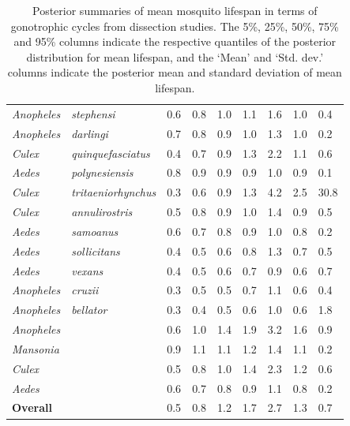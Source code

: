 \documentclass[12pt]{article}
\begin{document}
{\begin{table}[htbp]
\begin{tabular}{l|l|l|l|l|l|l|l|l}
		\textit{Anopheles} & \textit{stephensi} & 0.6 & 0.8 & 1.0 & 1.1 & 1.6 & 1.0 & 0.4 \\
		\textit{Anopheles} & \textit{darlingi} & 0.7 & 0.8 & 0.9 & 1.0 & 1.3 & 1.0 & 0.2 \\
		\textit{Culex} & \textit{quinquefasciatus} & 0.4 & 0.7 & 0.9 & 1.3 & 2.2 & 1.1 & 0.6 \\
		\textit{Aedes} & \textit{polynesiensis} & 0.8 & 0.9 & 0.9 & 0.9 & 1.0 & 0.9 & 0.1 \\
		\textit{Culex} & \textit{tritaeniorhynchus} & 0.3 & 0.6 & 0.9 & 1.3 & 4.2 & 2.5 & 30.8 \\
		\textit{Culex} & \textit{annulirostris} & 0.5 & 0.8 & 0.9 & 1.0 & 1.4 & 0.9 & 0.5 \\
		\textit{Aedes} & \textit{samoanus} & 0.6 & 0.7 & 0.8 & 0.9 & 1.0 & 0.8 & 0.2 \\
		\textit{Aedes} & \textit{sollicitans} & 0.4 & 0.5 & 0.6 & 0.8 & 1.3 & 0.7 & 0.5 \\
		\textit{Aedes} & \textit{vexans} & 0.4 & 0.5 & 0.6 & 0.7 & 0.9 & 0.6 & 0.7 \\
		\textit{Anopheles} & \textit{cruzii} & 0.3 & 0.5 & 0.5 & 0.7 & 1.1 & 0.6 & 0.4 \\
		\textit{Anopheles} & \textit{bellator} & 0.3 & 0.4 & 0.5 & 0.6 & 1.0 & 0.6 & 1.8 \\
		\hline
		\textit{Anopheles} & \textit{} & 0.6 & 1.0 & 1.4 & 1.9 & 3.2 & 1.6 & 0.9 \\
		\textit{Mansonia} & \textit{} & 0.9 & 1.1 & 1.1 & 1.2 & 1.4 & 1.1 & 0.2 \\
		\textit{Culex} & \textit{} & 0.5 & 0.8 & 1.0 & 1.4 & 2.3 & 1.2 & 0.6 \\
		\textit{Aedes} & \textit{} & 0.6 & 0.7 & 0.8 & 0.9 & 1.1 & 0.8 & 0.2 \\
		\hline
		\textbf{Overall} & \textit{} & 0.5 & 0.8 & 1.2 & 1.7 & 2.7 & 1.3 & 0.7 \\
	\end{tabular}
\caption{Posterior summaries of mean mosquito lifespan in terms of gonotrophic cycles from dissection studies. The 5\%, 25\%, 50\%, 75\% and 95\% columns indicate the respective quantiles of the posterior distribution for mean lifespan, and the `Mean' and `Std. dev.' columns indicate the posterior mean and standard deviation of mean lifespan.}
\label{tab:dissection_estimated_lifespans}%
\end{table}

}
\end{document}
